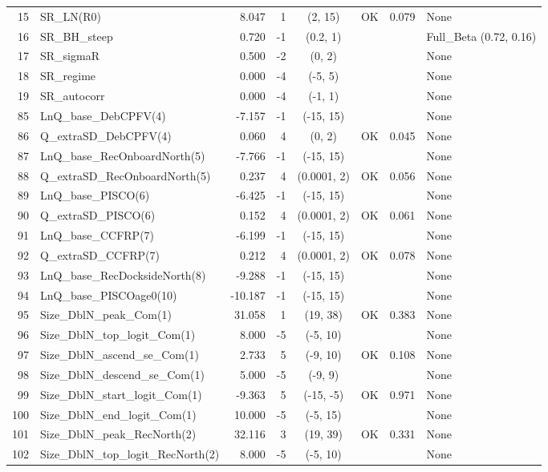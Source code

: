 \documentclass[12pt,]{article}
\begin{document}
\begin{landscape}
\begin{longtable}{rlrrcccp{1.5in}}
  15 & SR\_LN(R0) & 8.047 & 1 & (2, 15) & OK & 0.079 & None \\ 
  16 & SR\_BH\_steep & 0.720 & -1 & (0.2, 1) &  &  & Full\_Beta (0.72, 0.16) \\ 
  17 & SR\_sigmaR & 0.500 & -2 & (0, 2) &  &  & None \\ 
  18 & SR\_regime & 0.000 & -4 & (-5, 5) &  &  & None \\ 
  19 & SR\_autocorr & 0.000 & -4 & (-1, 1) &  &  & None \\ 
  85 & LnQ\_base\_DebCPFV(4) & -7.157 & -1 & (-15, 15) &  &  & None \\ 
  86 & Q\_extraSD\_DebCPFV(4) & 0.060 & 4 & (0, 2) & OK & 0.045 & None \\ 
  87 & LnQ\_base\_RecOnboardNorth(5) & -7.766 & -1 & (-15, 15) &  &  & None \\ 
  88 & Q\_extraSD\_RecOnboardNorth(5) & 0.237 & 4 & (0.0001, 2) & OK & 0.056 & None \\ 
  89 & LnQ\_base\_PISCO(6) & -6.425 & -1 & (-15, 15) &  &  & None \\ 
  90 & Q\_extraSD\_PISCO(6) & 0.152 & 4 & (0.0001, 2) & OK & 0.061 & None \\ 
  91 & LnQ\_base\_CCFRP(7) & -6.199 & -1 & (-15, 15) &  &  & None \\ 
  92 & Q\_extraSD\_CCFRP(7) & 0.212 & 4 & (0.0001, 2) & OK & 0.078 & None \\ 
  93 & LnQ\_base\_RecDocksideNorth(8) & -9.288 & -1 & (-15, 15) &  &  & None \\ 
  94 & LnQ\_base\_PISCOage0(10) & -10.187 & -1 & (-15, 15) &  &  & None \\ 
  95 & Size\_DblN\_peak\_Com(1) & 31.058 & 1 & (19, 38) & OK & 0.383 & None \\ 
  96 & Size\_DblN\_top\_logit\_Com(1) & 8.000 & -5 & (-5, 10) &  &  & None \\ 
  97 & Size\_DblN\_ascend\_se\_Com(1) & 2.733 & 5 & (-9, 10) & OK & 0.108 & None \\ 
  98 & Size\_DblN\_descend\_se\_Com(1) & 5.000 & -5 & (-9, 9) &  &  & None \\ 
  99 & Size\_DblN\_start\_logit\_Com(1) & -9.363 & 5 & (-15, -5) & OK & 0.971 & None \\ 
  100 & Size\_DblN\_end\_logit\_Com(1) & 10.000 & -5 & (-5, 15) &  &  & None \\ 
  101 & Size\_DblN\_peak\_RecNorth(2) & 32.116 & 3 & (19, 39) & OK & 0.331 & None \\ 
  102 & Size\_DblN\_top\_logit\_RecNorth(2) & 8.000 & -5 & (-5, 10) &  &  & None \\ 

\end{longtable}
\end{landscape}
\end{document}
